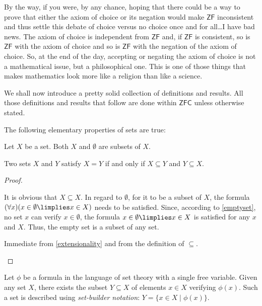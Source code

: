 \begin{para}
By the way, if you were, by any chance, hoping that there could be a way to prove that either the axiom of choice or its negation would make $\mathsf{ZF}$ inconsistent and thus settle this debate of choice versus no choice once and for all\ldots I have bad news. The axiom of choice is independent from $\mathsf{ZF}$ and, if $\mathsf{ZF}$ is consistent, so is $\mathsf{ZF}$ with the axiom of choice and so is $\mathsf{ZF}$ with the negation of the axiom of choice. So, at the end of the day, accepting or negating the axiom of choice is not a mathematical issue, but a philosophical one. This is one of those things that makes mathematics look more like a religion than like a science.

We shall now introduce a pretty solid collection of definitions and results. All those definitions and results that follow are done within $\mathsf{ZFC}$ unless otherwise stated.
\end{para}

\begin{proposition}
\label{setelementary}
The following elementary properties of sets are true:
\begin{statements}
\item Let $X$ be a set. Both $X$ and $\emptyset$ are subsets of $X$.
\item \label{doubleinclussion} Two sets $X$ and $Y$ satisfy $X = Y$ if and only if $X\subseteq Y$ and $Y\subseteq X$.
\end{statements}
\label{<+label+>}
\end{proposition}

\begin{proof}
\begin{parlist}
\item It is obvious that $X\subseteq X$. In regard to $\emptyset$, for it to be a subset of $X$, the formula $(\forall x)(x\in \emptyset \limplies x \in X)$ needs to be satisfied.
Since, according to \ref{emptyset}, no set $x$ can verify $x\in \emptyset$, the formula $x\in \emptyset \limplies x \in X$ is satisfied for any $x$ and $X$. Thus, the empty set is a subset of any set.

\item Immediate from \ref{extensionality} and from the definition of $\subseteq$.
\end{parlist}
\end{proof}


\begin{theorem}
Let $\phi$ be a formula in the language of set theory with a single free variable. Given any set $X$, there exists the subset $Y\subseteq X$ of elements $x\in X$ verifying $\phi(x)$.
Such a set is described using \emph{set-builder notation}: $Y = \{x\in X \mid \phi(x)\}$.
\label{specification}
\end{theorem}

